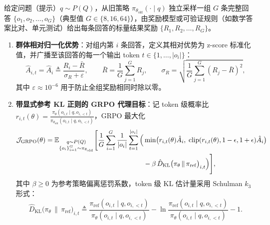 \begin{defBox}
\begin{definition}
\label{def:grpo}
给定问题（提示）$q \sim P(Q)$，从旧策略 $\pi_{\theta_{\mathrm{old}}}(\cdot \mid q)$ 独立采样一组 $G$ 条完整回答 $\{o_1, o_2, \dots, o_G\}$（典型值 $G \in \{8, 16, 64\}$），由奖励模型或可验证规则（如数学答案比对、单元测试）给出每条回答的标量结果奖励 $\{R_1, R_2, \dots, R_G\}$。
\begin{enumerate}
  \item \textbf{群体相对归一化优势}：对组内第 $i$ 条回答，定义其相对优势为 z-score 标准化值，并广播至该回答的每一个输出 token $t \in \{1, \dots, |o_i|\}$：
  \begin{equation}
    \hat{A}_{i, t} = \hat{A}_i \triangleq \frac{R_i - \bar{R}}{\sigma_R + \varepsilon}, \qquad
    \bar{R} = \frac{1}{G}\sum_{j=1}^G R_j, \qquad
    \sigma_R = \sqrt{\frac{1}{G}\sum_{j=1}^G (R_j - \bar{R})^2},
    \label{eq:grpo-adv}
  \end{equation}
  其中 $\varepsilon \approx 10^{-6}$ 用于防止全组奖励相同时除以零。
  \item \textbf{带显式参考 KL 正则的 GRPO 代理目标}：记 token 级概率比 $r_{i,t}(\theta) = \frac{\pi_\theta(o_{i,t} \mid q, o_{i,<t})}{\pi_{\theta_{\mathrm{old}}}(o_{i,t} \mid q, o_{i,<t})}$，GRPO 最大化
  \begin{equation}
  \begin{aligned}
    \mathcal{J}_{\mathrm{GRPO}}(\theta)
    = \mathbb{E}_{\substack{q \sim P(Q) \\ \{o_i\}_{i=1}^G \sim \pi_{\theta_{\mathrm{old}}}}}
    \Bigg[\frac{1}{G}\sum_{i=1}^G \frac{1}{|o_i|}\sum_{t=1}^{|o_i|}
    \Big(&\min\!\big(r_{i,t}(\theta)\hat{A}_i,\; \operatorname{clip}(r_{i,t}(\theta), 1-\epsilon, 1+\epsilon)\hat{A}_i\big) \\
    &- \beta\,\hat{D}_{\mathrm{KL}}\big(\pi_\theta \,\|\, \pi_{\mathrm{ref}}\big)_{i,t}\Big)\Bigg],
  \end{aligned}
  \label{eq:grpo-obj}
  \end{equation}
  其中 $\beta \ge 0$ 为参考策略偏离惩罚系数，token 级 KL 估计量采用 Schulman $k_3$ 形式：
  \begin{equation}
    \hat{D}_{\mathrm{KL}}\big(\pi_\theta \,\|\, \pi_{\mathrm{ref}}\big)_{i,t}
    \triangleq \frac{\pi_{\mathrm{ref}}(o_{i,t} \mid q, o_{i,<t})}{\pi_\theta(o_{i,t} \mid q, o_{i,<t})}
    - \ln \frac{\pi_{\mathrm{ref}}(o_{i,t} \mid q, o_{i,<t})}{\pi_\theta(o_{i,t} \mid q, o_{i,<t})} - 1.
    \label{eq:grpo-kl-k3}
  \end{equation}
\end{enumerate}
\end{definition}
\end{defBox}

